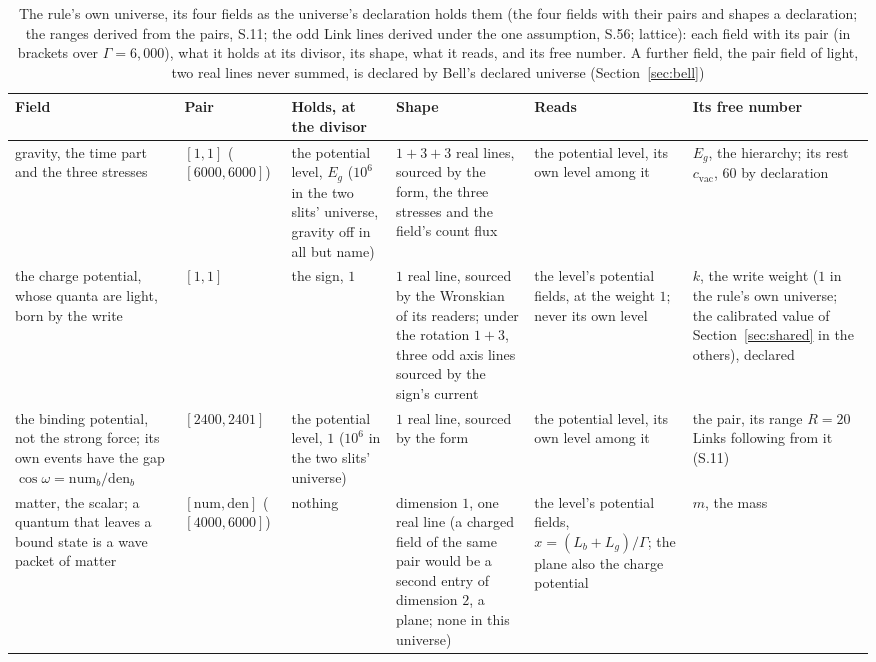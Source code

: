 \documentclass[pdflatex,sn-mathphys-num]{sn-jnl}
\newcommand{\num}{\mathrm{num}}
\newcommand{\den}{\mathrm{den}}
\theoremstyle{thmstyleone}
\theoremstyle{thmstyletwo}
\begin{document}
\begin{table}[!tb]\vspace{-4pt}\caption{\label{tab:universe}The rule's own universe, its four fields as the universe's declaration holds them (the four fields with their pairs and shapes a declaration; the ranges derived from the pairs, S.11; the odd Link lines derived under the one assumption, S.56; lattice): each field with its pair (in brackets over $\Gamma = 6{,}000$), what it holds at its divisor, its shape, what it reads, and its free number. A further field, the pair field of light, two real lines never summed, is declared by Bell's declared universe (Section~\ref{sec:bell})}
\small\setlength{\tabcolsep}{3pt}\begin{tabular}{L{2.0cm}L{1.9cm}L{2.0cm}L{2.0cm}L{1.8cm}L{2.0cm}}
\toprule
Field & Pair & Holds, at the divisor & Shape & Reads & Its free number\\
\midrule
gravity, the time part and the three stresses & $[1, 1]$ ($[6000, 6000]$) & the potential level, $E_g$ ($10^6$ in the two slits' universe, gravity off in all but name) & $1 + 3 + 3$ real lines, sourced by the form, the three stresses and the field's count flux & the potential level, its own level among it & $E_g$, the hierarchy; its rest $c_{\mathrm{vac}}$, $60$ by declaration\\
the charge potential, whose quanta are light, born by the write & $[1, 1]$ & the sign, $1$ & $1$ real line, sourced by the Wronskian of its readers; under the rotation $1 + 3$, three odd axis lines sourced by the sign's current & the level's potential fields, at the weight $1$; never its own level & $k$, the write weight ($1$ in the rule's own universe; the calibrated value of Section~\ref{sec:shared} in the others), declared\\
the binding potential, not the strong force; its own events have the gap $\cos\omega = \num_b / \den_b$ & $[2400, 2401]$ & the potential level, $1$ ($10^6$ in the two slits' universe) & $1$ real line, sourced by the form & the potential level, its own level among it & the pair, its range $R = 20$ Links following from it (S.11)\\
matter, the scalar; a quantum that leaves a bound state is a wave packet of matter & $[\num, \den]$ ($[4000, 6000]$) & nothing & dimension $1$, one real line (a charged field of the same pair would be a second entry of dimension $2$, a plane; none in this universe) & the level's potential fields, $x = (L_b + L_g) / \Gamma$; the plane also the charge potential & $m$, the mass\\
\bottomrule
\end{tabular}\vspace{-6pt}
\end{table}
\end{document}
